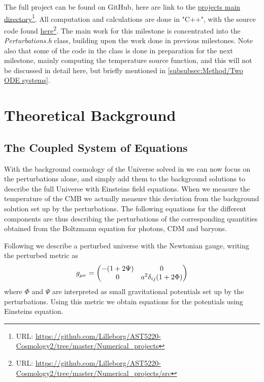 \documentclass[10pt,a4paper]{article}
\providecommand{\rCDM}
{\ensuremath{
\textrm{CDM}
}
}
\begin{document}
The full project can be found on GitHub, here are link to the \href{https://github.com/Lilleborg/AST5220-Cosmology2/tree/master/Numerical_projects}{projects main directory}\footnote{URL: \url{https://github.com/Lilleborg/AST5220-Cosmology2/tree/master/Numerical_projects}}. All computation and calculations are done in "C++", with the source code found \href{https://github.com/Lilleborg/AST5220-Cosmology2/tree/master/Numerical_projects/src}{here}\footnote{URL: \url{https://github.com/Lilleborg/AST5220-Cosmology2/tree/master/Numerical_projects/src}}. The main work for this milestone is concentrated into the \textit{Perturbations.h} class, building upon the work done in previous milestones. Note also that some of the code in the class is done in preparation for the next milestone, mainly computing the temperature source function, and this will not be discussed in detail here, but briefly mentioned in \cref{subsubsec:Method/Two ODE systems}.

\section{Theoretical Background}
\label{sec:Theory}

\subsection{The Coupled System of Equations}
\label{subsec:Theory/Coupled equations}

With the background cosmology of the Universe solved in \cite{milestone1} we can now focus on the perturbations alone, and simply add them to the background solutions to describe the full Universe with Einsteins field equations. When we measure the temperature of the CMB we actually measure this deviation from the background solution set up by the perturbations. The following equations for the different components are thus describing the perturbations of the corresponding quantities obtained from the Boltzmann equation for photons, \rCDM and baryons.

Following \cite{Calin} we describe a perturbed universe with the Newtonian gauge, writing the perturbed metric as 
\begin{equation}
\tensor{g}{_\mu_\nu} =
\begin{pmatrix}
    -(1+2\Psi) & 0
    \\
    0 & a^2\delta_{ij}(1+2\Phi)
\end{pmatrix}
\end{equation}
where $\Phi$ and $\Psi$ are interpreted as small gravitational potentials set up by the perturbations. Using this metric we obtain equations for the potentials using Einsteins equation.
\end{document}
